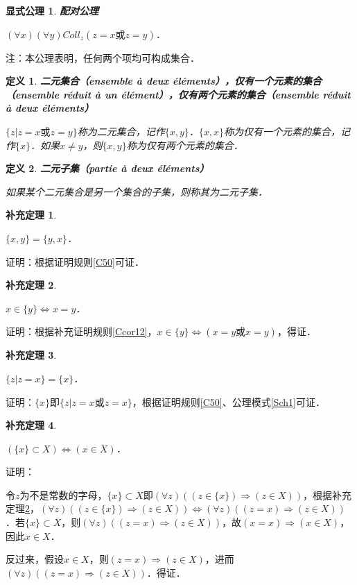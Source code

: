 \documentclass[12pt, a4paper, oneside]{book}
\newtheorem{ex}{显式公理}
\newtheorem{cor}{补充定理}
\newtheorem{de}{定义}
\begin{document}
			\begin{ex}\label{ex2}
				\textbf{配对公理}
				\par
				$(\forall x)(\forall y) Coll_z(z=x\text{或}z=y)$．
			\end{ex}
			注：本公理表明，任何两个项均可构成集合．

			\begin{de}
				\textbf{二元集合（ensemble à deux éléments），仅有一个元素的集合（ensemble réduit à un élément），仅有两个元素的集合（ensemble réduit à deux éléments）}
				\par
				$\{z|z=x\text{或}z=y\}$称为二元集合，记作$\{x, y\}$．$\{x, x\}$称为仅有一个元素的集合，记作$\{x\}$．如果$x\neq y$，则$\{x, y\}$称为仅有两个元素的集合．
			\end{de}

			\begin{de}
				\textbf{二元子集（partie à deux éléments）}
				\par
				如果某个二元集合是另一个集合的子集，则称其为二元子集．
			\end{de}

			\begin{cor}\label{cor5}
				\hfill\par
				$\{x, y\}=\{y, x\}$．
			\end{cor}
			证明：根据证明规则\ref{C50}可证．

			\begin{cor}\label{cor6}
				\hfill\par
				$x\in \{y\}\Leftrightarrow x=y$．
			\end{cor}
			证明：根据补充证明规则\ref{Ccor12}，$x\in \{y\}\Leftrightarrow (x=y\text{或}x=y)$，得证．

			\begin{cor}\label{cor7}
				\hfill\par
				$\{z|z=x\}=\{x\}$．
			\end{cor}
			证明：$\{x\}$即$\{z|z=x\text{或}z=x\}$，根据证明规则\ref{C50}、公理模式\ref{Sch1}可证．
			
			\begin{cor}\label{cor8}
				\hfill\par
				$(\{x\}\subset X)\Leftrightarrow (x\in X)$．
			\end{cor}
			证明：
			\par
			令$z$为不是常数的字母，$\{x\}\subset X$即$(\forall z)((z\in \{x\})\Rightarrow (z\in X))$，根据补充定理\ref{cor6}，$(\forall z)((z\in \{x\})\Rightarrow (z\in X))\Leftrightarrow (\forall z)((z=x)\Rightarrow (z\in X))$．若$\{x\}\subset X$，则$(\forall z)((z=x)\Rightarrow (z\in X))$，故$(x=x)\Rightarrow (x\in X)$，因此$x\in X$．
			\par
			反过来，假设$x\in X$，则$(z=x)\Rightarrow (z\in X)$，进而$(\forall z)((z=x)\Rightarrow (z\in X))$．得证．
\end{document}
